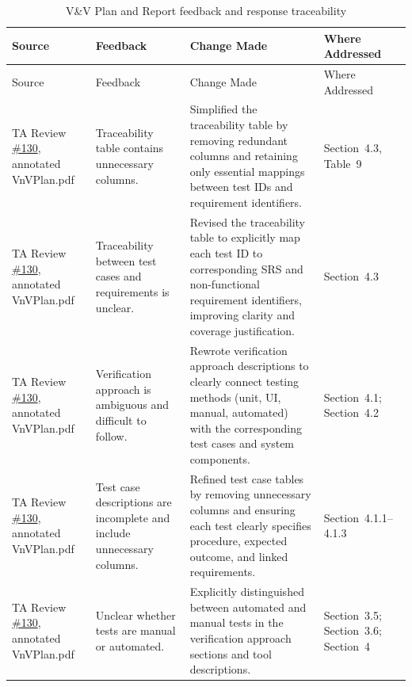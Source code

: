 \documentclass{article}
\begin{document}
\begin{longtable}{p{} p{}
                  p{} p{}}
\caption{V\&V Plan and Report feedback and response traceability}
\label{tab:vnv-plan-report-trace}\\
\toprule
Source & Feedback & Change Made & Where Addressed \\
\midrule
\endfirsthead

\toprule
Source & Feedback & Change Made & Where Addressed \\
\midrule
\endhead

\bottomrule
\endfoot

TA Review \href{https://github.com/thaafei/DomainX/issues/130}{\#130},
annotated VnVPlan.pdf
&
Traceability table contains unnecessary columns.
&
Simplified the traceability table by removing redundant columns and
retaining only essential mappings between test IDs and requirement
identifiers.
&
Section~4.3, Table~9
\\

TA Review \href{https://github.com/thaafei/DomainX/issues/130}{\#130},
annotated VnVPlan.pdf
&
Traceability between test cases and requirements is unclear.
&
Revised the traceability table to explicitly map each test ID to
corresponding SRS and non-functional requirement identifiers,
improving clarity and coverage justification.
&
Section~4.3
\\

TA Review \href{https://github.com/thaafei/DomainX/issues/130}{\#130},
annotated VnVPlan.pdf
&
Verification approach is ambiguous and difficult to follow.
&
Rewrote verification approach descriptions to clearly connect testing
methods (unit, UI, manual, automated) with the corresponding test
cases and system components.
&
Section~4.1; Section~4.2
\\

TA Review \href{https://github.com/thaafei/DomainX/issues/130}{\#130},
annotated VnVPlan.pdf
&
Test case descriptions are incomplete and include unnecessary columns.
&
Refined test case tables by removing unnecessary columns and ensuring
each test clearly specifies procedure, expected outcome, and linked
requirements.
&
Section~4.1.1--4.1.3
\\

TA Review \href{https://github.com/thaafei/DomainX/issues/130}{\#130},
annotated VnVPlan.pdf
&
Unclear whether tests are manual or automated.
&
Explicitly distinguished between automated and manual tests in the
verification approach sections and tool descriptions.
&
Section~3.5; Section~3.6; Section~4
\\


\end{longtable}
\end{document}
